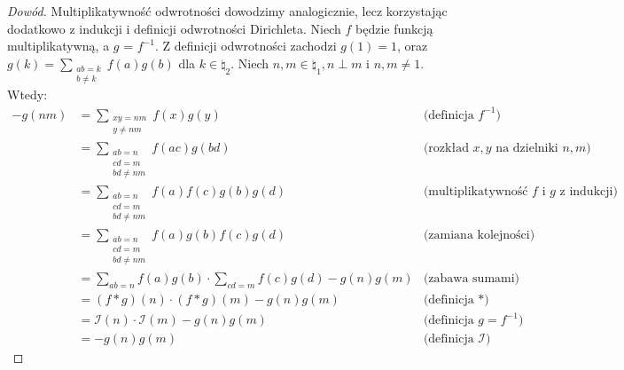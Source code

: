 \begin{proof}[Dowód]
	Multiplikatywność odwrotności dowodzimy analogicznie, lecz korzystając
	dodatkowo z indukcji i definicji odwrotności Dirichleta.
	Niech \(f\) będzie funkcją multiplikatywną, a \(g\) = \(f^{-1}\). Z definicji odwrotności zachodzi \(g(1) = 1\),
	oraz \(g(k) = \sum_{\substack{ab = k \\ b \neq k}} f(a)g(b)\) dla \(k \in \natural_2\).
	Niech \(n, m \in \natural_1, n \perp m\) i \(n, m \neq 1\). Wtedy:
	\begin{align*}
		-g(nm) & = \sum_{                                                                                                                         \substack{xy = nm                                   \\ y \neq nm}} f(x)g(y)                             & \text{(definicja $f^{-1}$)}                                   \\
		       & = \sum_{                                                                                                                         \substack{ab = n                                    \\ cd = m \\ bd \neq nm}} f(ac)g(bd)                   & \text{(rozkład $x, y$ na dzielniki $n, m$)}                   \\
		       & = \sum_{                                                                                                                         \substack{ab = n                                    \\ cd = m \\ bd \neq nm}} f(a)f(c)g(b)g(d)             & \text{(multiplikatywność $f$ i $g$ z indukcji)}               \\
		       & = \sum_{                                                                                                                         \substack{ab = n                                    \\ cd = m \\ bd \neq nm}} f(a)g(b)f(c)g(d)             & \text{(zamiana kolejności)}                                   \\
		       & = \sum_{ab = n} f(a)g(b) \cdot \sum_{cd = m} f(c)g(d) - g(n)g(m)                                                                                   & \text{(zabawa sumami)}          \\
		       & = (f*g)(n) \cdot (f*g)(m) - g(n)g(m)                                                                                                               & \text{(definicja $*$)}          \\
		       & = \mathcal I(n) \cdot \mathcal I(m) - g(n)g(m)                                                                                                     & \text{(definicja $g = f^{-1}$)} \\
		       & = -g(n)g(m)                                                                                                                                        & \text{(definicja $\mathcal I$)}
	\end{align*}
\end{proof}


